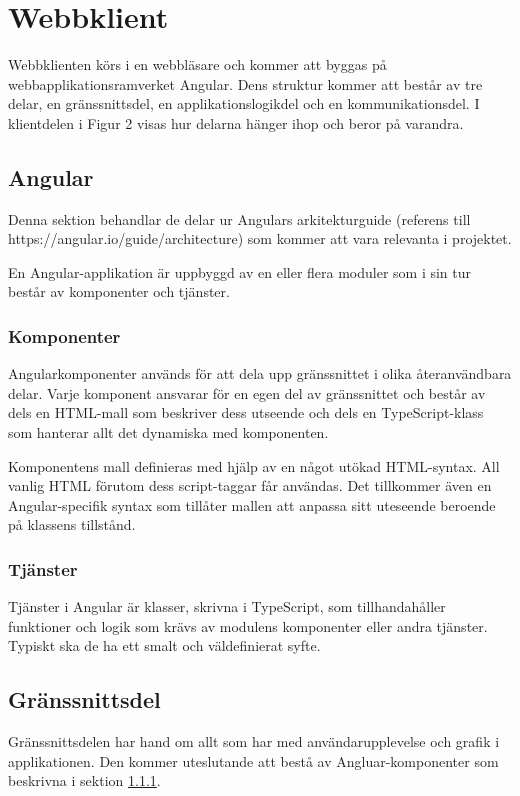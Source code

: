\documentclass[a4paper,10pt]{article}
\begin{document}
\section{Webbklient}
\label{sec:webbklient}
Webbklienten körs i en webbläsare och kommer att byggas på webbapplikationsramverket Angular. Dens struktur kommer att består av tre delar, en gränssnittsdel, en applikationslogikdel och en kommunikationsdel. I klientdelen i Figur 2 visas hur delarna hänger ihop och beror på varandra.

\subsection{Angular}
Denna sektion behandlar de delar ur Angulars arkitekturguide (referens till https://angular.io/guide/architecture) som kommer att vara relevanta i projektet.

En Angular-applikation är uppbyggd av en eller flera moduler som i sin tur består av komponenter och tjänster.
\subsubsection{Komponenter}
\label{sec:komponent}
Angularkomponenter används för att dela upp gränssnittet i olika återanvändbara delar. Varje komponent ansvarar för en egen del av gränssnittet och består av dels en HTML-mall som beskriver dess utseende och dels en TypeScript-klass som hanterar allt det dynamiska med komponenten.

Komponentens mall definieras med hjälp av en något utökad HTML-syntax. All vanlig HTML förutom dess script-taggar får användas. Det tillkommer även en Angular-specifik syntax som tillåter mallen att anpassa sitt uteseende beroende på klassens tillstånd.
\subsubsection{Tjänster}
Tjänster i Angular är klasser, skrivna i TypeScript, som tillhandahåller funktioner och logik som krävs av modulens komponenter eller andra tjänster. Typiskt ska de ha ett smalt och väldefinierat syfte.

\subsection{Gränssnittsdel}
Gränssnittsdelen har hand om allt som har med användarupplevelse och grafik i applikationen. Den kommer uteslutande att bestå av Angluar-komponenter som beskrivna i sektion \ref{sec:komponent}.
\end{document}
